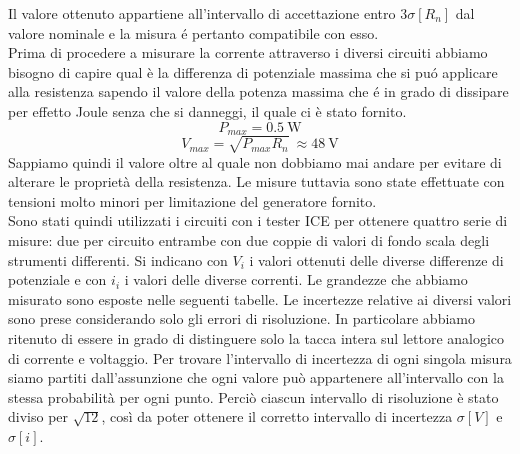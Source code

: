 \documentclass{article}
\begin{document}
Il valore ottenuto appartiene all'intervallo di accettazione entro $3 \sigma[R_n]$ dal valore nominale e la misura \'e pertanto compatibile con esso. \\
Prima di procedere a misurare la corrente attraverso i diversi circuiti abbiamo bisogno di capire qual è la differenza di potenziale massima che si pu\'o applicare alla resistenza sapendo il valore della potenza massima che \'e in grado di dissipare per effetto Joule senza che si danneggi, il quale ci è stato fornito.
\begin{equation}
    P_{max} = 0.5\ \si{\watt}
\end{equation}
\begin{equation}
    V_{max} = \sqrt{P_{max}R_{n}}\ \approx \SI{48}{\volt}
\end{equation}
Sappiamo quindi il valore oltre al quale non dobbiamo mai andare per evitare di alterare le proprietà della resistenza. Le misure tuttavia sono state effettuate con tensioni molto minori per limitazione del generatore fornito. \\
Sono stati quindi utilizzati i circuiti con i tester ICE per ottenere quattro serie di misure: due per circuito entrambe con due coppie di valori di fondo scala degli strumenti differenti. Si indicano con $V_i$ i valori ottenuti delle diverse differenze di potenziale e con $i_i$ i valori delle diverse correnti. Le grandezze che abbiamo misurato sono esposte nelle seguenti tabelle. Le incertezze relative ai diversi valori sono prese considerando solo gli errori di risoluzione. In particolare abbiamo ritenuto di essere in grado di distinguere solo la tacca intera sul lettore analogico di corrente e voltaggio. Per trovare l'intervallo di incertezza di ogni singola misura siamo partiti dall'assunzione che ogni valore può appartenere all'intervallo con la stessa probabilità per ogni punto. Perciò ciascun intervallo di risoluzione è stato diviso per $\sqrt{12}$, così da poter ottenere il corretto intervallo di incertezza $\sigma[V]$ e $\sigma[i]$.
\end{document}
